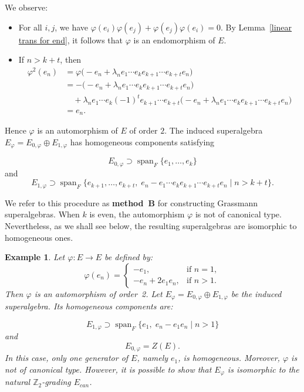 \documentclass{article}
\newtheorem{example}[theorem]{Example}
\begin{document}
	We observe:
	\begin{itemize}
		\item For all $i,j$, we have $\varphi(e_{i})\varphi(e_{j}) + \varphi(e_{j})\varphi(e_{i}) = 0$.  
		By Lemma~\ref{linear trans for end}, it follows that $\varphi$ is an endomorphism of $E$.
		\item If $n > k+t$, then
		\begin{align*}
			\varphi^{2}(e_{n}) 
			&= \varphi\big(-e_{n} + \lambda_{n}e_{1} \cdots e_{k} e_{k+1} \cdots e_{k+t} e_{n}\big) \\
			&= -\big(-e_{n} + \lambda_{n}e_{1} \cdots e_{k} e_{k+1} \cdots e_{k+t} e_{n}\big) \\
			&\quad + \lambda_{n}e_{1} \cdots e_{k} (-1)^{t} e_{k+1} \cdots e_{k+t} \big(-e_{n} + \lambda_{n}e_{1} \cdots e_{k} e_{k+1} \cdots e_{k+t} e_{n}\big) \\
			&= e_{n}.
		\end{align*}
	\end{itemize}
	
	Hence $\varphi$ is an automorphism of $E$ of order $2$.  
	The induced superalgebra $E_{\varphi} = E_{0,\varphi} \oplus E_{1,\varphi}$ has homogeneous components satisfying
	
	\[E_{0,\varphi} \supset \operatorname{span}_{F}\{e_{1}, \ldots, e_{k}\}\]
	and
	\[E_{1,\varphi} \supset \operatorname{span}_{F}\{e_{k+1}, \ldots, e_{k+t}, \; e_{n} - e_{1} \cdots e_{k} e_{k+1} \cdots e_{k+t} e_{n} \mid n > k+t\}.\]
	
	
	We refer to this procedure as \textbf{method~B} for constructing Grassmann superalgebras.  
	When $k$ is even, the automorphism $\varphi$ is not of canonical type.  
	Nevertheless, as we shall see below, the resulting superalgebras are isomorphic to homogeneous ones.  
	
	\begin{example}
		\label{prop_minus}
		Let $\varphi \colon E \to E$ be defined by:
		\[
		\varphi(e_{n}) =
		\begin{cases}
			-e_{1}, & \text{if } n = 1, \\[2pt]
			-e_{n} + 2e_{1}e_{n}, & \text{if } n > 1.
		\end{cases}
		\]
		Then $\varphi$ is an automorphism of order~2.  
		Let $E_{\varphi} = E_{0,\varphi} \oplus E_{1,\varphi}$ be the induced superalgebra.  
		Its homogeneous components are:
		
		\[E_{1,\varphi} \supset \operatorname{span}_{F}\{e_{1}, \; e_{n} - e_{1}e_{n} \mid n > 1\}\]
		and
		\[E_{0,\varphi} = Z(E).\]
		In this case, only one generator of $E$, namely $e_{1}$, is homogeneous.  
		Moreover, $\varphi$ is not of canonical type.  
		However, it is possible to show that $E_{\varphi}$ is isomorphic to the natural $\mathbb{Z}_{2}$-grading $E_{can}$.
	\end{example}
	
\end{document}
